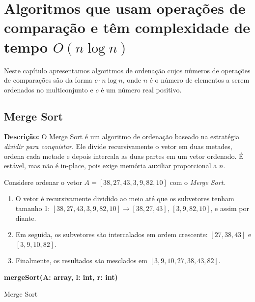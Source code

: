 \chapter{Algoritmos que usam operações de comparação e têm complexidade de tempo $O(n\log n)$}

Neste capítulo apresentamos algoritmos de ordenação cujos números de operações de comparações são da forma $c \cdot n \log n$, onde $n$ é o número de elementos a serem ordenados no multiconjunto e $c$ é um número real positivo.  

\section{Merge Sort}

\textbf{Descrição:} O Merge Sort é um algoritmo de ordenação baseado na estratégia \textit{dividir para conquistar}. Ele divide recursivamente o vetor em duas metades, ordena cada metade e depois intercala as duas partes em um vetor ordenado. É estável, mas não é in-place, pois exige memória auxiliar proporcional a $n$.

\begin{exmp}
Considere ordenar o vetor $A = [38, 27, 43, 3, 9, 82, 10]$ com o \textit{Merge Sort}.

\begin{enumerate}
    \item O vetor é recursivamente dividido ao meio até que os subvetores tenham tamanho 1:  
    $[38, 27, 43, 3, 9, 82, 10] \to [38, 27, 43]$, $[3, 9, 82, 10]$, e assim por diante.
    
    \item Em seguida, os subvetores são intercalados em ordem crescente:  
    $[27, 38, 43]$ e $[3, 9, 10, 82]$.
    
    \item Finalmente, os resultados são mesclados em $[3, 9, 10, 27, 38, 43, 82]$.
\end{enumerate}
\end{exmp}

\begin{algorithm}[H]
\DontPrintSemicolon
\textbf{mergeSort(A: array, l: int, r: int)}\;
\caption{Merge Sort}
\label{lab:alg-mergeSort}
\end{algorithm}

